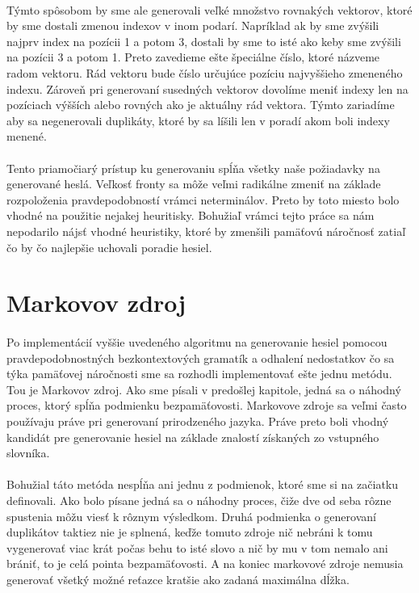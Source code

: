 \paragraph{}
Týmto spôsobom by sme ale generovali veľké množstvo rovnakých vektorov, ktoré by sme dostali zmenou indexov v inom podarí. Napríklad ak by sme zvýšili najprv index na pozícii 1 a potom 3, dostali by sme to isté ako keby sme zvýšili na pozícii 3 a potom 1. Preto zavedieme ešte špeciálne číslo, ktoré názveme radom vektoru. Rád vektoru bude číslo určujúce pozíciu najvyššieho zmeneného indexu. Zároveň pri generovaní susedných vektorov dovolíme meniť indexy len na pozíciach výšších alebo rovných ako je aktuálny rád vektora. Týmto zariadíme aby sa negenerovali duplikáty, ktoré by sa líšili len v poradí akom boli indexy menené.
\paragraph{}
Tento priamočiarý prístup ku generovaniu spĺňa všetky naše požiadavky na generované heslá. Veľkosť fronty sa môže veľmi radikálne zmeniť na základe rozpoloženia pravdepodobností vrámci neterminálov. Preto by toto miesto bolo vhodné na použitie nejakej heuritisky. Bohužiaľ vrámci tejto práce sa nám nepodarilo nájsť vhodné heuristiky, ktoré by zmenšili pamäťovú náročnosť zatiaľ čo by čo najlepšie uchovali poradie hesiel.

\section{Markovov zdroj}
\paragraph{}
Po implementácií vyššie uvedeného algoritmu na generovanie hesiel pomocou pravdepodobnostných bezkontextových gramatík a odhalení nedostatkov čo sa týka pamäťovej náročnosti sme sa rozhodli implementovať ešte jednu metódu. Tou je Markovov zdroj. Ako sme písali v predošlej kapitole, jedná sa o náhodný proces, ktorý spĺňa podmienku bezpamäťovosti. Markovove zdroje sa veľmi často používaju práve pri generovaní prirodzeného jazyka. Práve preto boli vhodný kandidát pre generovanie hesiel na základe znalostí získaných zo vstupného slovníka. 

\paragraph{}
Bohužial táto metóda nespĺňa ani jednu z podmienok, ktoré sme si na začiatku definovali. Ako bolo písane jedná sa o náhodny proces, čiže dve od seba rôzne spustenia môžu viesť k rôznym výsledkom. Druhá podmienka o generovaní duplikátov taktiez nie je splnená, keďže tomuto zdroje nič nebráni k tomu vygenerovať viac krát počas behu to isté slovo a nič by mu v tom nemalo ani brániť, to je celá pointa bezpamäťovosti. A na koniec markovové zdroje nemusia generovať všetký možné reťazce kratšie ako zadaná maximálna dĺžka.

